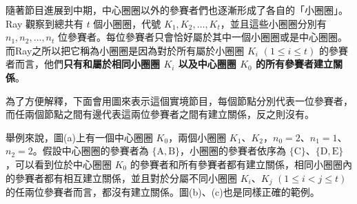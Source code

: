 隨著節目進展到中期，中心圈圈以外的參賽者們也逐漸形成了各自的「小圈圈」。Ray
觀察到總共有 \(t\) 個小圈圈，代號
\(K_1, K_2, \ldots, K_t\)，並且這些小圈圈分別有
\(n_1, n_2, \ldots, n_t\)
位參賽者。每位參賽者只會恰好屬於其中一個小圈圈或是中心圈圈。而Ray之所以把它稱為小圈圈是因為對於所有屬於小圈圈
\(K_i\) \((1 \leq i \leq t)\)
的參賽者而言，他們\textbf{只有和屬於相同小圈圈 \(K_i\) 以及中心圈圈
\(K_0\) 的所有參賽者建立關係}。

為了方便解釋，下面會用圖來表示這個實境節目，每個節點分別代表一位參賽者，而任兩個節點之間有邊代表這兩位參賽者之間有建立關係，反之則沒有。

舉例來說，圖(a)上有一個中心圈圈 \(K_0\)，兩個小圈圈
\(K_1\)、\(K_2\)，\(n_0=2\)、\(n_1=1\)、\(n_2=2\)。假設中心圈圈的參賽者為
\(\{\text{A}, \text{B}\}\)，小圈圈的參賽者依序為
\(\{\text{C}\}\)、\(\{\text{D}, \text{E}\}\)，可以看到位於中心圈圈
\(K_0\)
的參賽者和所有參賽者都有建立關係，相同小圈圈內的參賽者都有相互建立關係，並且對於分屬不同小圈圈
\(K_i\)、\(K_j\) \((1 \leq i < j \leq t)\)
的任兩位參賽者而言，都沒有建立關係。圖(b)、(c)也是同樣正確的範例。

